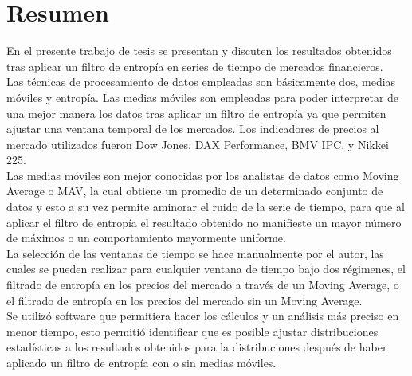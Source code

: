 %

\chapter*{Resumen}
\label{sec:abstract}

En el presente trabajo de tesis se presentan y discuten los resultados obtenidos tras aplicar un filtro de entropía en series de tiempo de mercados financieros.\\
 
Las técnicas de procesamiento de datos empleadas son básicamente dos, medias móviles y entropía. Las medias móviles son empleadas para poder interpretar de una mejor manera los datos tras aplicar un filtro de entropía ya que permiten ajustar una ventana temporal de los mercados. Los indicadores de precios al mercado utilizados fueron Dow Jones, DAX Performance, BMV IPC, y Nikkei 225.\\

Las medias móviles son mejor conocidas por los analistas de datos como Moving Average o MAV, la cual obtiene un promedio de un determinado conjunto de datos y esto a su vez permite aminorar el ruido de la serie de tiempo, para que al aplicar el filtro de entropía el resultado obtenido no manifieste un mayor número de máximos o un comportamiento mayormente uniforme.\\

La selección de las ventanas de tiempo se hace manualmente por el autor, las cuales se pueden realizar para cualquier ventana de tiempo bajo dos régimenes, el filtrado de entropía en los precios del mercado a través de un Moving Average, o el filtrado de entropía en los precios del mercado sin un Moving Average.\\

Se utilizó software que permitiera hacer los cálculos y un análisis más preciso en menor tiempo, esto permitió identificar que es posible ajustar distribuciones estadísticas a los resultados obtenidos para la distribuciones después de haber aplicado un filtro de entropía con o sin medias móviles. %
\cleardoublepage